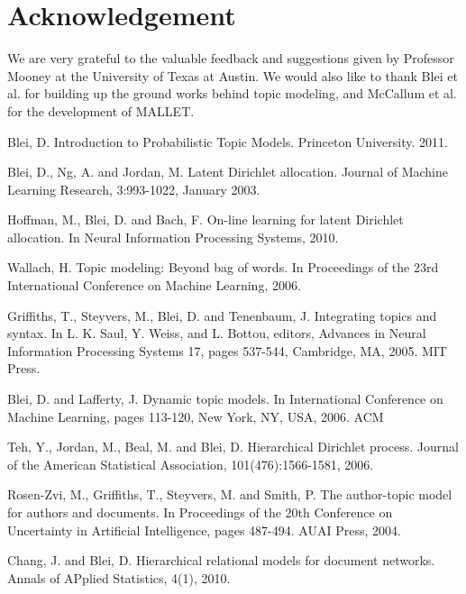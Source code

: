 \documentclass[conference]{IEEEtran}
\begin{document}
\section{Acknowledgement}

We are very grateful to the valuable feedback and suggestions given by Professor Mooney at the University of Texas at Austin. We would also like to thank Blei et al. for building up the ground works behind topic modeling, and McCallum et al. for the development of MALLET.

\begin{thebibliography}{1}

Blei, D. Introduction to Probabilistic Topic Models. Princeton University. 2011.

Blei, D., Ng, A. and Jordan, M. Latent Dirichlet allocation. Journal of Machine Learning Research, 3:993-1022, January 2003.

Hoffman, M., Blei, D. and Bach, F. On-line learning for latent Dirichlet allocation. In Neural Information Processing Systems, 2010.

Wallach, H. Topic modeling: Beyond bag of words. In Proceedings of the 23rd International Conference on Machine Learning, 2006.

Griffiths, T., Steyvers, M., Blei, D. and Tenenbaum, J. Integrating topics and syntax. In L. K. Saul, Y. Weiss, and L. Bottou, editors, Advances in Neural Information Processing Systems 17, pages 537-544, Cambridge, MA, 2005. MIT Press.

Blei, D. and Lafferty, J. Dynamic topic models. In International Conference on Machine Learning, pages 113-120, New York, NY, USA, 2006. ACM

Teh, Y., Jordan, M., Beal, M. and Blei, D. Hierarchical Dirichlet process. Journal of the American Statistical Association, 101(476):1566-1581, 2006.

Rosen-Zvi, M., Griffiths, T., Steyvers, M. and Smith, P. The author-topic model for authors and documents. In Proceedings of the 20th Conference on Uncertainty in Artificial Intelligence, pages 487-494. AUAI Press, 2004.

Chang, J. and Blei, D. Hierarchical relational models for document networks. Annals of APplied Statistics, 4(1), 2010.


\end{thebibliography}
\end{document}
